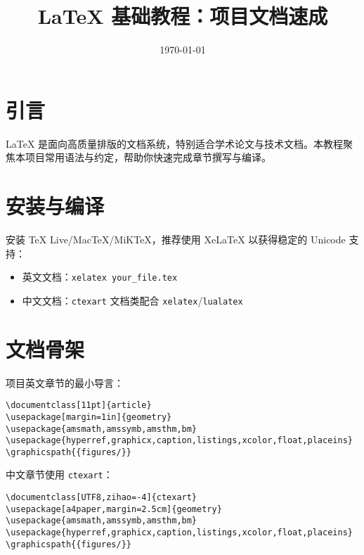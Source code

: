 \documentclass[UTF8,zihao=-4]{ctexart}
\title{LaTeX 基础教程：项目文档速成}
\author{}
\date{\today}
\begin{document}
\maketitle

\section{引言}
LaTeX 是面向高质量排版的文档系统，特别适合学术论文与技术文档。本教程聚焦本项目常用语法与约定，帮助你快速完成章节撰写与编译。

\section{安装与编译}
安装 TeX Live/MacTeX/MiKTeX，推荐使用 XeLaTeX 以获得稳定的 Unicode 支持：
\begin{itemize}
  \item 英文文档：\texttt{xelatex your\_file.tex}
  \item 中文文档：\texttt{ctexart} 文档类配合 \texttt{xelatex}/\texttt{lualatex}
\end{itemize}

\section{文档骨架}
项目英文章节的最小导言：
\begin{lstlisting}[style=code,caption={最小导言（英文）}]
\documentclass[11pt]{article}
\usepackage[margin=1in]{geometry}
\usepackage{amsmath,amssymb,amsthm,bm}
\usepackage{hyperref,graphicx,caption,listings,xcolor,float,placeins}
\graphicspath{{figures/}}
\end{lstlisting}

中文章节使用 \texttt{ctexart}：
\begin{lstlisting}[style=code,caption={最小导言（中文）}]
\documentclass[UTF8,zihao=-4]{ctexart}
\usepackage[a4paper,margin=2.5cm]{geometry}
\usepackage{amsmath,amssymb,amsthm,bm}
\usepackage{hyperref,graphicx,caption,listings,xcolor,float,placeins}
\graphicspath{{figures/}}
\end{lstlisting}
\end{document}
